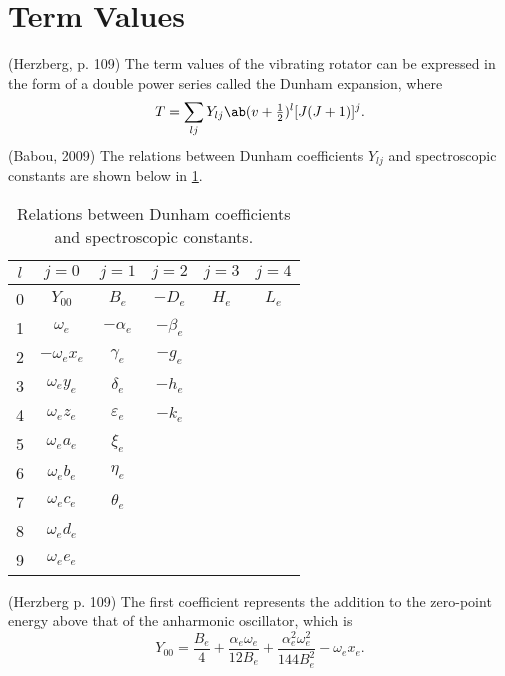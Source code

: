 \documentclass[11pt, twoside, fleqn]{report}
\begin{document}
\section{Term Values}

 (Herzberg, p. 109)
The term values of the vibrating rotator can be expressed in the form of a double power series called the Dunham expansion, where
\begin{equation*}
    T = \sum_{lj}Y_{lj}\ab(v + \tfrac{1}{2})^{l} [J(J + 1)]^{j}.
\end{equation*}
(Babou, 2009)
The relations between Dunham coefficients $Y_{lj}$ and spectroscopic constants are shown below in \cref{t:dunham_coefficients}.
\begin{table}[H]
    \centering
    \caption{Relations between Dunham coefficients and spectroscopic constants.}
    \label{t:dunham_coefficients}
    \begin{tabular}{c|ccccc}
        \toprule
        $l$ & $j = 0$            & $j = 1$           & $j = 2$      & $j = 3$ & $j = 4$ \\
        \midrule
        0   & $Y_{00}$           & $B_{e}$           & $-D_{e}$     & $H_{e}$ & $L_{e}$ \\
        1   & $\omega_{e}$       & $-\alpha_{e}$     & $-\beta_{e}$ &         &         \\
        2   & $-\omega_{e}x_{e}$ & $\gamma_{e}$      & $-g_{e}$     &         &         \\
        3   & $\omega_{e}y_{e}$  & $\delta_{e}$      & $-h_{e}$     &         &         \\
        4   & $\omega_{e}z_{e}$  & $\varepsilon_{e}$ & $-k_{e}$     &         &         \\
        5   & $\omega_{e}a_{e}$  & $\xi_{e}$         &              &         &         \\
        6   & $\omega_{e}b_{e}$  & $\eta_{e}$        &              &         &         \\
        7   & $\omega_{e}c_{e}$  & $\theta_{e}$      &              &         &         \\
        8   & $\omega_{e}d_{e}$  &                   &              &         &         \\
        9   & $\omega_{e}e_{e}$  &                   &              &         &         \\
        \bottomrule
    \end{tabular}
\end{table}
(Herzberg p. 109)
The first coefficient represents the addition to the zero-point energy above that of the anharmonic oscillator, which is
\begin{equation*}
    Y_{00} = \frac{B_{e}}{4} + \frac{\alpha_{e}\omega_{e}}{12B_{e}} + \frac{\alpha_{e}^{2}\omega_{e}^{2}}{144B_{e}^{2}} - \omega_{e}x_{e}.
\end{equation*}
\end{document}
